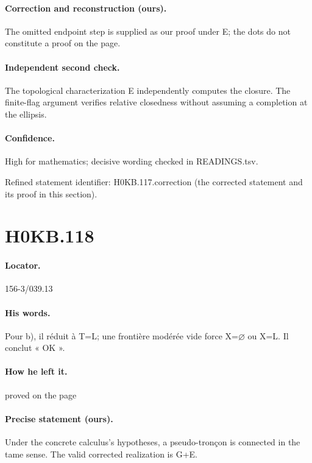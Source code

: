 \paragraph{Correction and reconstruction (ours).} The omitted endpoint step is supplied as our proof under E; the dots do not constitute a proof on the page.

\paragraph{Independent second check.} The topological characterization E independently computes the closure. The finite-flag argument verifies relative closedness without assuming a completion at the ellipsis.

\paragraph{Confidence.} High for mathematics; decisive wording checked in READINGS.tsv.

\noindent Refined statement identifier: H0KB.117.correction (the corrected statement and its proof in this section).

\section*{H0KB.118}\label{statement:H0KB.118}
\paragraph{Locator.} 156-3/039.13

\paragraph{His words.} Pour b), il réduit à T=L; une frontière modérée vide force X=\ensuremath{\varnothing} ou X=L. Il conclut « OK ».

\paragraph{How he left it.} proved on the page

\paragraph{Precise statement (ours).} Under the concrete calculus’s hypotheses, a pseudo-tronçon is connected in the tame sense. The valid corrected realization is G+E.

